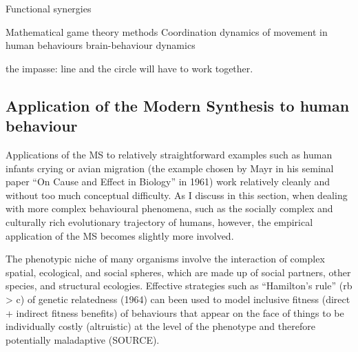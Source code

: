 Functional synergies

Mathematical game theory methods
Coordination dynamics of movement in human behaviours
brain-behaviour dynamics


the impasse: line and the circle will have to work together.









\subsection{Application of the Modern Synthesis to human behaviour}
Applications of the MS to relatively straightforward examples such as human infants crying or avian migration (the example chosen by Mayr in his seminal paper ``On Cause and Effect in Biology'' in 1961) work relatively cleanly and without too much conceptual difficulty.  As I discuss in this section, when dealing with more complex behavioural phenomena, such as the socially complex and culturally rich evolutionary trajectory of humans, however, the empirical application of the MS becomes slightly more involved.

 The phenotypic niche of many organisms involve the interaction of complex spatial, ecological, and social spheres, which are made up of social partners, other species, and structural ecologies.  Effective strategies such as ``Hamilton's rule'' (rb > c) of genetic relatedness (1964) can been used to model inclusive fitness (direct + indirect fitness benefits) of behaviours that appear on the face of things to be individually costly (altruistic) at the level of the phenotype and therefore potentially maladaptive (SOURCE).

